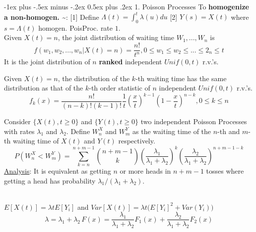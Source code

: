 \documentclass[10pt,landscape,letterpaper]{article}
\makeatletter
\renewcommand{\section}{\@startsection{section}{1}{0mm}%
                                {-1ex plus -.5ex minus -.2ex}%
                                {0.5ex plus .2ex}%
                                {\sffamily\large}}
\renewcommand{\subsubsection}{\@startsection{subsubsection}{3}{0mm}%
                                {-1ex plus -.5ex minus -.2ex}%
                                {1ex plus .2ex}%
                                {\normalfont\small\itshape}}
\makeatother
\begin{document}
\begin{multicols}{3}


\section{1. Poisson Processes}
To \textbf{homogenize a non-homogen. \textasciitilde}: [1] Define $\Lambda (t) = \int_0 ^t \lambda(u) du$ [2] $Y(s) = X(t)$ where $s = \Lambda(t)$ homogen. PoisProc. rate $1$.
\\




Given $X(t) = n$, the joint distribution of waiting time $W_1, ..., W_n$ is
\[
f(w_1, w_2, ..., w_n | X(t) = n) = \frac{n!}{t^n}, 0 \le w_1 \le w_2 \le ... \le 2_n \le t
\]
It is the joint distribution of $n$ \textbf{ranked} independent $Unif(0, t)$ r.v.'s.

\smallskip

Given $X(t) = n$, the distribution of the $k$-th waiting time has the same distribution as that of the $k$-th order statistic of $n$ independent $Unif(0, t)$ r.v.'s.
\[
f_k(x) = \frac{n!}{(n-k)! (k-1)!} \frac{1}{t} (\frac{x}{t})^{k-1} (1 - \frac{x}{t})^{n-k}, 0 \le k \le n
\]


Consider $\{ X(t), t \ge 0 \}$ and  $\{ Y(t), t \ge 0 \}$ two independent Poisson Processes with rates $\lambda_1$ and $\lambda_2$. Define $W_{n}^{X}$ and $W_{m}^{Y}$ as the waiting time of the $n$-th and $m$-th waiting time of $X(t)$ and $Y(t)$ respectively.
\[
P(W_{n}^{X} < W_{m}^{Y}) = \sum_{k=n}^{n+m-1} {{n+m-1}\choose{k}}    (\frac{\lambda_1}{\lambda_1 
	+ \lambda_2})^k (\frac{\lambda_2}{\lambda_1 + \lambda_2})^{n+m-1-k}
\]
\underline{Analysis}: It is equivalent as getting $n$ or more heads in $n+m-1$ tosses where getting a head has probability $\lambda_1 / (\lambda_1 + \lambda_2)$.

\smallskip

\\
$E[X(t)] = \lambda t E[Y_i]$ and $Var[ X(t) ] = \lambda t \Big( E[Y_i]^2 +  Var(Y_i) \Big)$
\[
\lambda = \lambda_1 + \lambda_2
\, 
F(x) = \frac{\lambda_1}{\lambda_1 + \lambda_2} F_1(x) + \frac{\lambda_2}{\lambda_1 + \lambda_2} F_2(x)
\]



\end{multicols}
\end{document}

